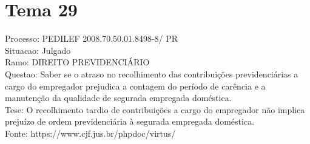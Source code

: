 \documentclass[12pt]{article}
\begin{document}
\section*{Tema 29}
Processo: PEDILEF 2008.70.50.01.8498-8/ PR\\
Situacao: Julgado\\
Ramo: DIREITO PREVIDENCIÁRIO\\
Questao: Saber se o atraso no recolhimento das contribuições previdenciárias a cargo do empregador prejudica a contagem do período de carência e a manutenção da qualidade de segurada empregada doméstica.\\
Tese: O recolhimento tardio de contribuições a cargo do empregador não implica prejuízo de ordem previdenciária à segurada empregada doméstica.\\
Fonte: https://www.cjf.jus.br/phpdoc/virtus/
\end{document}
